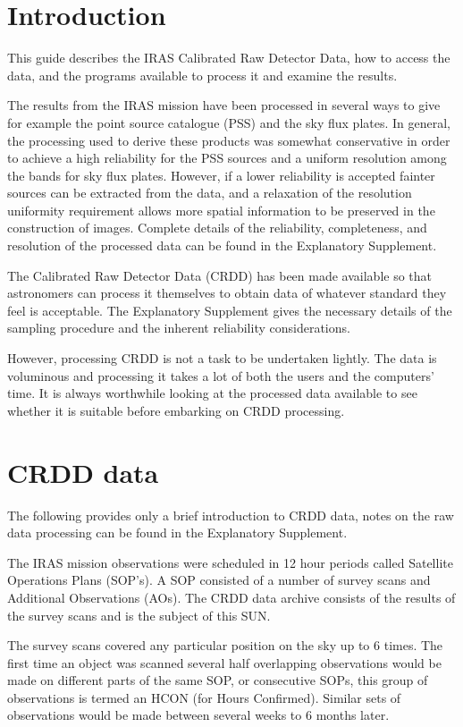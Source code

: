 \section {Introduction}

This guide describes the IRAS Calibrated Raw Detector Data, how to access the
data, and the programs available to process it and examine the results.

The results from the IRAS mission have been processed in several ways to give
for example the point source catalogue (PSS) and the sky flux plates. In
general, the processing used to derive these products was somewhat conservative
in order to achieve a high reliability for the PSS sources and a uniform
resolution among the bands for sky flux plates. However, if a lower reliability
is accepted fainter sources can be extracted from the data, and a relaxation of
the resolution uniformity requirement allows more spatial information to be
preserved in the construction of images.
Complete details of the reliability, completeness, and resolution of the
processed data can be found in the Explanatory Supplement.

The Calibrated Raw Detector Data (CRDD) has been made available so that
astronomers can process it themselves to obtain data of whatever standard
they feel is acceptable. The Explanatory Supplement gives the necessary details
of the sampling procedure and the inherent reliability considerations.

However, processing CRDD is not a task to be undertaken lightly. The data is
voluminous and processing it takes a lot of both the users and the computers'
time. It is always worthwhile looking at the processed data available to see
whether it is suitable before embarking on CRDD processing.

\section{CRDD data}

The following provides only a brief introduction to CRDD data, notes on the raw
data processing can be found in the Explanatory Supplement.

The IRAS mission observations were scheduled in 12 hour periods called
Satellite Operations Plans (SOP's). A SOP consisted of a number of survey scans
and Additional Observations (AOs). The CRDD data archive consists of the
results of the survey scans and is the subject of this SUN.

The survey scans covered any particular position on the sky up to 6 times. The
first time an object was scanned several half overlapping observations would be
made on different parts of the same SOP, or consecutive SOPs, this group of
observations is termed an HCON (for Hours Confirmed). Similar sets of
observations would be made between several weeks to 6 months later.

